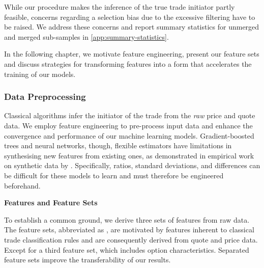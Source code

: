While our procedure makes the inference of the true trade initiator partly feasible, concerns regarding a selection bias due to the excessive filtering have to be raised. We address these concerns and report summary statistics for unmerged and merged sub-samples in \cref{app:summary-statistics}.

In the following chapter, we motivate feature engineering, present our feature sets and discuss strategies for transforming features into a form that accelerates the training of our models.

\subsubsection{Data Preprocessing}\label{sec:data-preprocessing}

Classical algorithms infer the initiator of the trade from the \emph{raw} price and quote data. We employ feature engineering to pre-process input data and enhance the convergence and performance of our machine learning models. Gradient-boosted trees and neural networks, though, flexible estimators have limitations in synthesising new features from existing ones, as demonstrated in empirical work on synthetic data by \textcite[][5--6]{heatonEmpiricalAnalysisFeature2016}. Specifically, ratios, standard deviations, and differences can be difficult for these models to learn and must therefore be engineered beforehand.

\textbf{Features and Feature Sets}

To establish a common ground, we derive three sets of features from raw data. The feature sets, abbreviated as , are motivated by features inherent to classical trade classification rules and are consequently derived from quote and price data. Except for a third feature set, which includes option characteristics. Separated feature sets improve the transferability of our results.

